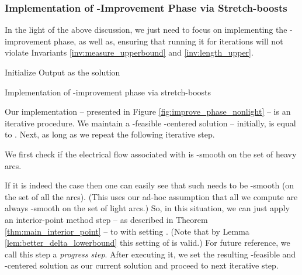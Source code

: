 \documentclass[11pt, letterpaper]{article}
\begin{document}
\subsubsection*{Implementation of -Improvement Phase via Stretch-boosts}

In the light of the above discussion, we just need to focus on implementing the -improvement phase, as well as, ensuring that running it for  iterations will not violate Invariants \ref{inv:measure_upperbound} and \ref{inv:length_upper}. 



\IncMargin{1em}
\begin{algorithm}
\DontPrintSemicolon
\SetAlFnt{\small \sf}


\AlFnt
{}
\BlankLine
{Initialize }\;
Output  as the solution \;
\caption{Implementation of -improvement phase via stretch-boosts}\label{fig:improve_phase_nonlight}
\end{algorithm}\DecMargin{1em}

Our implementation -- presented in Figure \ref{fig:improve_phase_nonlight} -- is an iterative procedure. We maintain a -feasible -centered solution  -- initially,  is equal to . Next, as long as  we repeat the following iterative step. 

We first check if the electrical flow  associated with  is -smooth on the set of heavy arcs. 

If it is indeed the case then one can easily see that such  needs to be -smooth (on the set of all the arcs). (This uses our ad-hoc assumption that all  we compute are always -smooth on the set of light arcs.) So, in this situation, we can just apply an interior-point method step -- as described in Theorem \ref{thm:main_interior_point} -- to  with setting . (Note that by Lemma \ref{lem:better_delta_lowerbound} this setting of  is valid.)  For future reference, we call this step a {\em progress step}. After executing it, we set the resulting -feasible and -centered solution  as our current solution and proceed to next iterative step. 
\end{document}
